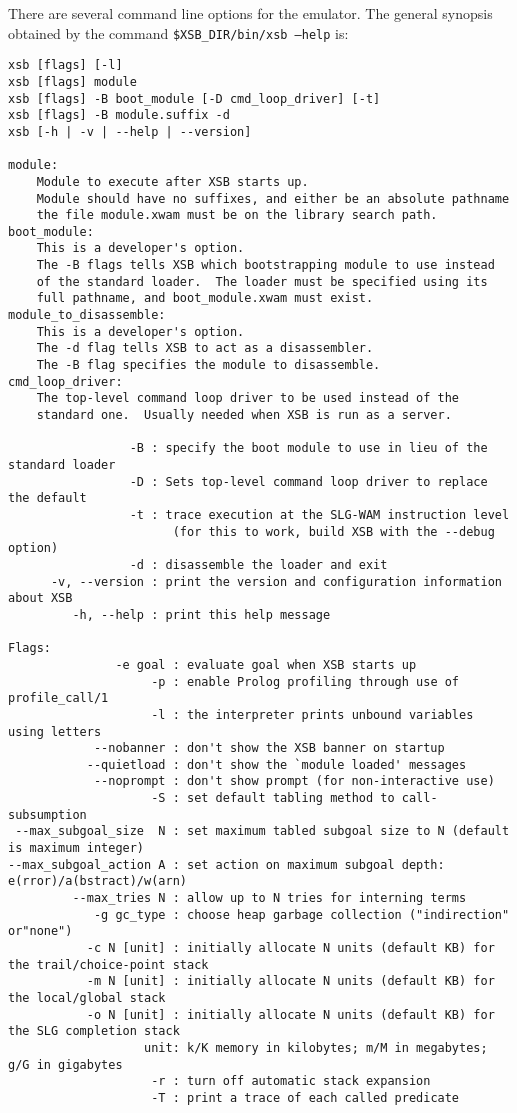 There are several command line options for the emulator. The general 
synopsis obtained by the command {\tt \$XSB\_DIR/bin/xsb --help} is: 
{\small 
\begin{verbatim}
xsb [flags] [-l] 
xsb [flags] module
xsb [flags] -B boot_module [-D cmd_loop_driver] [-t] 
xsb [flags] -B module.suffix -d
xsb [-h | -v | --help | --version]

module:
    Module to execute after XSB starts up.
    Module should have no suffixes, and either be an absolute pathname
    the file module.xwam must be on the library search path.
boot_module:
    This is a developer's option.
    The -B flags tells XSB which bootstrapping module to use instead
    of the standard loader.  The loader must be specified using its
    full pathname, and boot_module.xwam must exist.
module_to_disassemble:
    This is a developer's option.
    The -d flag tells XSB to act as a disassembler.
    The -B flag specifies the module to disassemble.
cmd_loop_driver:
    The top-level command loop driver to be used instead of the
    standard one.  Usually needed when XSB is run as a server.

                 -B : specify the boot module to use in lieu of the standard loader
                 -D : Sets top-level command loop driver to replace the default
                 -t : trace execution at the SLG-WAM instruction level
                       (for this to work, build XSB with the --debug option)
                 -d : disassemble the loader and exit
      -v, --version : print the version and configuration information about XSB
         -h, --help : print this help message

Flags: 
               -e goal : evaluate goal when XSB starts up
                    -p : enable Prolog profiling through use of profile_call/1
                    -l : the interpreter prints unbound variables using letters
            --nobanner : don't show the XSB banner on startup
           --quietload : don't show the `module loaded' messages
            --noprompt : don't show prompt (for non-interactive use)
                    -S : set default tabling method to call-subsumption
 --max_subgoal_size  N : set maximum tabled subgoal size to N (default is maximum integer)
--max_subgoal_action A : set action on maximum subgoal depth: e(rror)/a(bstract)/w(arn)
         --max_tries N : allow up to N tries for interning terms
            -g gc_type : choose heap garbage collection ("indirection" or"none")
           -c N [unit] : initially allocate N units (default KB) for the trail/choice-point stack
           -m N [unit] : initially allocate N units (default KB) for the local/global stack
           -o N [unit] : initially allocate N units (default KB) for the SLG completion stack
                   unit: k/K memory in kilobytes; m/M in megabytes; g/G in gigabytes
                    -r : turn off automatic stack expansion
                    -T : print a trace of each called predicate

\end{verbatim}
}
